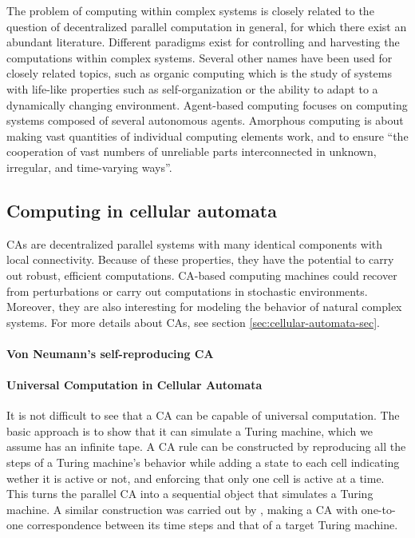 The problem of computing within complex systems is closely related to the
question of decentralized parallel computation in general, for which there exist
an abundant literature. Different paradigms exist for controlling and harvesting
the computations within complex systems. Several other names have been used for
closely related topics, such as organic computing
\parencite{muller-schloerOrganicComputingParadigm2011} which is the study of
systems with life-like properties such as self-organization or the ability to
adapt to a dynamically changing environment. Agent-based computing
\parencite{jenningsAgentBasedComputingPromise1999} focuses on computing systems
composed of several autonomous agents. Amorphous computing
\parencite{abelsonAmorphousComputing2000,
  nagpalProgrammablePatternFormationScaleIndependence2008,
  nagpalProgrammableSelfassemblyUsing2002} is about making vast quantities of
individual computing elements work, and to ensure ``the cooperation of vast
numbers of unreliable parts interconnected in unknown, irregular, and
time-varying ways''.

\subsection{Computing in cellular automata}\label{sec:comp-cell-autom}

\Acfp{CA} are decentralized parallel systems with many identical components with
local connectivity. Because of these properties, they have the potential to
carry out robust, efficient computations. \ac{CA}-based computing machines could
recover from perturbations or carry out computations in stochastic environments.
Moreover, they are also interesting for modeling the behavior of natural complex
systems. For more details about \acp{CA}, see section
\ref{sec:cellular-automata-sec}.

\paragraph{Von Neumann's self-reproducing \ac{CA}}


\paragraph{Universal Computation in Cellular Automata}
It is not difficult to see that a \ac{CA} can be capable of universal
computation. The basic approach is to show that it can simulate a Turing
machine, which we assume has an infinite tape. A \ac{CA} rule can be constructed
by reproducing all the steps of a Turing machine's behavior while adding a state
to each cell indicating wether it is active or not, and enforcing that only one
cell is active at a time. This turns the parallel \ac{CA} into a sequential
object that simulates a Turing machine. A similar construction was carried out
by \parencite{smithSimpleComputationUniversalCellular1971}, making a \ac{CA}
with one-to-one correspondence between its time steps and that of a target
Turing machine.

